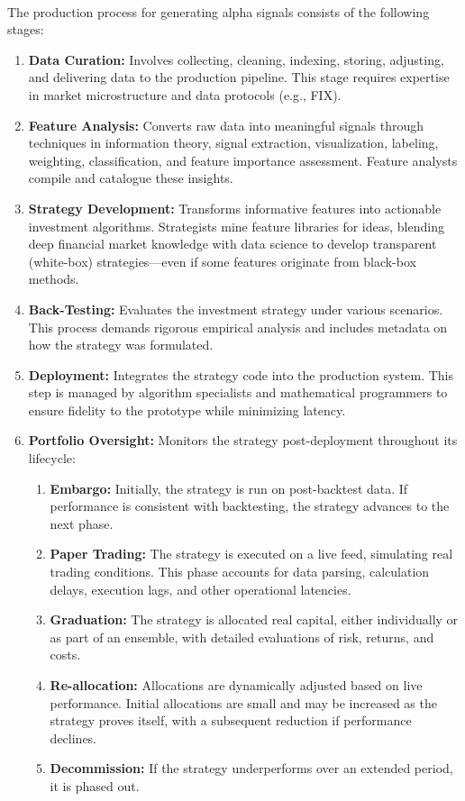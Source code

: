 \begin{method} \\
The production process for generating alpha signals consists of the following stages:
\begin{enumerate}[label=\roman*.]
\setlength{\itemsep}{0pt}
\item \textbf{Data Curation:} Involves collecting, cleaning, indexing, storing, adjusting, and delivering data to the production pipeline. This stage requires expertise in market microstructure and data protocols (e.g., FIX).
\item \textbf{Feature Analysis:} Converts raw data into meaningful signals through techniques in information theory, signal extraction, visualization, labeling, weighting, classification, and feature importance assessment. Feature analysts compile and catalogue these insights.
\item \textbf{Strategy Development:} Transforms informative features into actionable investment algorithms. Strategists mine feature libraries for ideas, blending deep financial market knowledge with data science to develop transparent (white-box) strategies—even if some features originate from black-box methods.
\item \textbf{Back-Testing:} Evaluates the investment strategy under various scenarios. This process demands rigorous empirical analysis and includes metadata on how the strategy was formulated.
\item \textbf{Deployment:} Integrates the strategy code into the production system. This step is managed by algorithm specialists and mathematical programmers to ensure fidelity to the prototype while minimizing latency.
\item \textbf{Portfolio Oversight:} Monitors the strategy post-deployment throughout its lifecycle:
  \begin{enumerate}[label=\arabic*.]
  \setlength{\itemsep}{0pt}
  \item \textbf{Embargo:} Initially, the strategy is run on post-backtest data. If performance is consistent with backtesting, the strategy advances to the next phase.
  \item \textbf{Paper Trading:} The strategy is executed on a live feed, simulating real trading conditions. This phase accounts for data parsing, calculation delays, execution lags, and other operational latencies.
  \item \textbf{Graduation:} The strategy is allocated real capital, either individually or as part of an ensemble, with detailed evaluations of risk, returns, and costs.
  \item \textbf{Re-allocation:} Allocations are dynamically adjusted based on live performance. Initial allocations are small and may be increased as the strategy proves itself, with a subsequent reduction if performance declines.
  \item \textbf{Decommission:} If the strategy underperforms over an extended period, it is phased out.
  \end{enumerate}
\end{enumerate}
\end{method}








